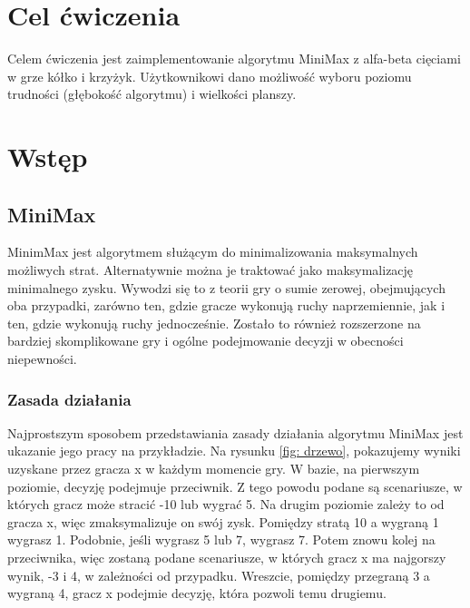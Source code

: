 \documentclass[12pt]{article}
\begin{document}
    

    \tableofcontents
    \newpage
    \section{Cel ćwiczenia}
        Celem ćwiczenia jest zaimplementowanie algorytmu MiniMax z alfa-beta cięciami w grze kółko i krzyżyk.
        Użytkownikowi dano możliwość wyboru poziomu trudności (głębokość algorytmu) i wielkości planszy.
    \section{Wstęp}
        \subsection{MiniMax}
            MinimMax jest algorytmem służącym do  minimalizowania maksymalnych możliwych strat. Alternatywnie można je traktować 
            jako maksymalizację minimalnego zysku. Wywodzi się to z teorii gry o sumie zerowej, obejmujących oba przypadki, 
            zarówno ten, gdzie gracze wykonują ruchy naprzemiennie, jak i ten, gdzie wykonują ruchy jednocześnie. 
            Zostało to również rozszerzone na bardziej skomplikowane gry i ogólne podejmowanie decyzji w obecności niepewności. 
            \subsubsection{Zasada działania}
                Najprostszym sposobem przedstawiania zasady działania algorytmu MiniMax jest ukazanie jego pracy na przykładzie.
                Na rysunku \ref{fig: drzewo}, pokazujemy wyniki uzyskane przez gracza x w każdym momencie gry. W bazie, na pierwszym poziomie, decyzję podejmuje przeciwnik. Z tego powodu podane są scenariusze, w których gracz może stracić -10 lub wygrać 5.
                Na drugim poziomie zależy to od gracza x, więc zmaksymalizuje on swój zysk. Pomiędzy stratą 10 a wygraną 1 wygrasz 1. Podobnie, jeśli wygrasz 5 lub 7, wygrasz 7.
                Potem znowu kolej na przeciwnika, więc zostaną podane scenariusze, w których gracz x ma najgorszy wynik, -3 i 4, w zależności od przypadku. Wreszcie, pomiędzy przegraną 3 a wygraną 4, gracz x podejmie decyzję, która pozwoli temu drugiemu.
\end{document}
